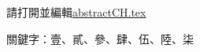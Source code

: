 \begin{abstractCH}

  請打開並編輯\href{run:./abstractCH.tex}{abstractCH.tex}
  
  關鍵字：壹、貳、參、肆、伍、陸、柒

\end{abstractCH}
